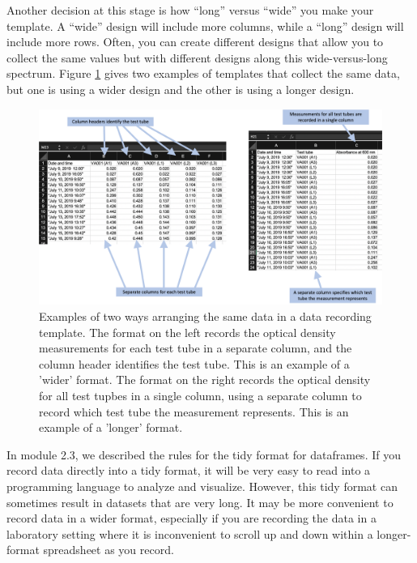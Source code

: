 \documentclass[]{tufte-book}
\begin{document}
Another decision at this stage is how ``long'' versus ``wide'' you make your
template. A ``wide'' design will include more columns, while a ``long'' design will
include more rows. Often, you can create different designs that allow you to
collect the same values but with different designs along this wide-versus-long
spectrum. Figure \ref{fig:longversuswide} gives two examples of templates that
collect the same data, but one is using a wider design and the other is using a
longer design.

\begin{figure}
\includegraphics[width=\textwidth]{figures/growth_curve_long_vs_wide} \caption[Examples of two ways arranging the same data in a data recording template]{Examples of two ways arranging the same data in a data recording template. The format on the left records the optical density measurements for each test tube in a separate column, and the column header identifies the test tube. This is an example of a 'wider' format. The format on the right records the optical density for all test tupbes in a single column, using a separate column to record which test tube the measurement represents. This is an example of a 'longer' format.}\label{fig:longversuswide}
\end{figure}

In module 2.3, we described the rules for the tidy format for dataframes.
If you record data directly into a tidy format, it will be very easy to
read into a programming language to analyze and visualize. However,
this tidy format can sometimes result in datasets that are very long. It
may be more convenient to record data in a wider format, especially if you
are recording the data in a laboratory setting where it is inconvenient to
scroll up and down within a longer-format spreadsheet as you record.
\end{document}
